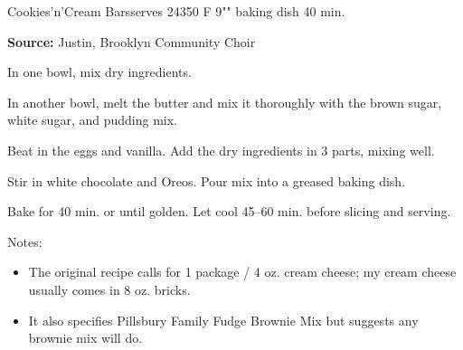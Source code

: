\begin{recipe}{Cookies'n'Cream Bars}{serves 24}{350\0 F \hfill 9"" baking dish \hfill 40 min.}

 \freeform \textbf{Source:} Justin, Brooklyn Community Choir

 In one bowl, mix dry ingredients.

 In another bowl, melt the butter and mix it thoroughly with the brown sugar, white sugar, and pudding mix.

 Beat in the eggs and vanilla. Add the dry ingredients in 3 parts, mixing well.

 Stir in white chocolate and Oreos. Pour mix into a greased baking dish.

 \newstep Bake for 40 min. or until golden. Let cool 45--60 min. before slicing and serving.

 \freeform Notes:
 \begin{itemize}
  \item The original recipe calls for 1 package / 4 oz. cream cheese; my cream cheese usually comes in 8 oz. bricks.
  \item It also specifies Pillsbury Family Fudge Brownie Mix but suggests any brownie mix will do.
 \end{itemize}
\end{recipe}
